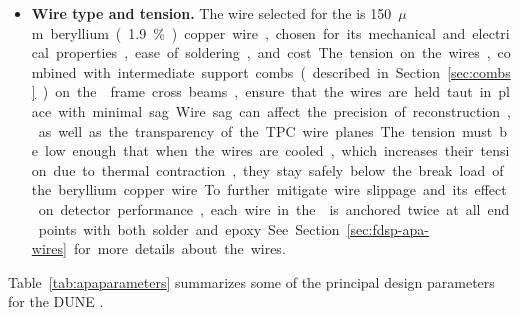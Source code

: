 \begin{itemize}
\item \textbf{Wire type and tension.}  The wire selected for the  is \SI{150}{$\mu$m} beryllium (\num{1.9}\%) copper wire, %
chosen for its mechanical and electrical properties, ease of soldering, and cost.  The tension on the wires, combined with intermediate support combs (described in Section~\ref{sec:combs}) on the  frame cross beams, ensure that the wires are held taut in place with minimal sag.  Wire sag can affect the precision of reconstruction, as well as the transparency of the TPC wire planes.  The tension must be low enough that when the wires are cooled, which increases their tension due to thermal contraction, they stay safely below the break load of the beryllium copper wire.  To further mitigate wire slippage and its effect on detector performance, each wire in the  is anchored twice at all end points with both solder and epoxy.  See Section~\ref{sec:fdsp-apa-wires} for more details about the wires.
\end{itemize}

Table~\ref{tab:apaparameters} summarizes some of the principal design parameters for the DUNE 
.

